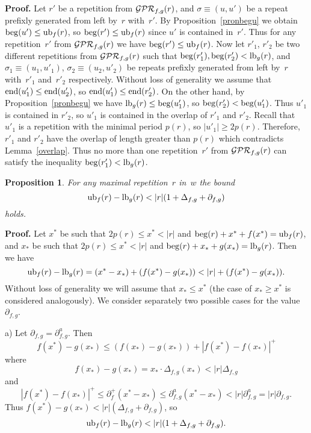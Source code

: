 \documentclass{article}
\newtheorem{proposition}{Proposition}
\begin{document}
{\bf Proof.} Let $r'$ be a repetition from ${\cal GPR}_{f,g} (r)$, and
$\sigma\equiv (u, u')$ be a repeat prefixly generated from left by~$r$ 
with~$r'$. By Proposition~\ref{pronbegu} we obtain ${\rm beg} (u')\le {\rm ub}_f (r)$,
so ${\rm beg} (r')\le {\rm ub}_f (r)$ since $u'$ is contained in~$r'$.
Thus for any repetition~$r'$ from ${\cal GPR}_{f,g} (r)$ we have
${\rm beg} (r')\le {\rm ub}_f (r)$. Now let $r'_1$, $r'_2$ be two different
repetitions from ${\cal GPR}_{f,g} (r)$ such that 
${\rm beg} (r'_1), {\rm beg} (r'_2)<{\rm lb}_g (r)$, and $\sigma_1\equiv (u_1, u'_1)$,
$\sigma_2\equiv (u_2, u'_2)$ be repeats prefixly generated from left by~$r$ 
with~$r'_1$ and~$r'_2$ respectively. Without loss of generality we assume
that ${\rm end} (u'_1)\le {\rm end} (u'_2)$, so ${\rm end} (u'_1)\le {\rm end} (r'_2)$.
On the other hand, by Proposition~\ref{pronbegu} we have ${\rm lb}_g (r)\le {\rm beg} (u'_1)$,
so ${\rm beg} (r'_2)<{\rm beg} (u'_1)$. Thus $u'_1$ is contained in $r'_2$, so
$u'_1$ is contained in the overlap of $r'_1$ and $r'_2$. Recall that $u'_1$ is
a repetition with the minimal period $p(r)$, so $|u'_1|\ge 2p(r)$. Therefore, $r'_1$ 
and $r'_2$ have the overlap of length greater than $p(r)$ which contradicts
Lemma~\ref{overlap}. Thus no more than one repetition~$r'$ from ${\cal GPR}_{f,g} (r)$
can satisfy the inequality ${\rm beg} (r'_1)<{\rm lb}_g (r)$.

\begin{proposition}
For any maximal repetition~$r$ in~$w$ the bound
$$
{\rm ub}_f (r)-{\rm lb}_g (r)<|r|(1+\Delta_{f, g}+\partial_{f, g})
$$
holds.
\label{ulbound}
\end{proposition}

{\bf Proof.} Let $x^*$ be such that $2p(r)\le x^*<|r|$ and ${\rm beg} (r)+x^*+f(x^*)={\rm ub}_f (r)$,
and $x_*$ be such that $2p(r)\le x^*<|r|$ and ${\rm beg} (r)+x_*+g(x_*)={\rm lb}_g (r)$. 
Then we have
$$
{\rm ub}_f (r)-{\rm lb}_g (r)=(x^*-x_*)+(f(x^*)-g(x_*))<|r|+(f(x^*)-g(x_*)).
$$
Without loss of generality we will assume that $x_*\le x^*$ (the case of $x_*\ge x^*$ 
is considered analogously). We consider separately two possible cases for
the value $\partial_{f, g}$.

a) Let $\partial_{f, g}=\partial^a_{f, g}$. Then
$$
f(x^*)-g(x_*)\le (f(x_*)-g(x_*))+|f(x^*)-f(x_*)|^+
$$
where
$$
f(x_*)-g(x_*)=x_*\cdot\Delta_{f, g}(x_*)<|r|\Delta_{f, g}
$$
and
$$
|f(x^*)-f(x_*)|^+\le \partial^+_f(x^*-x_*)\le \partial^a_{f, g}(x^*-x_*)
<|r|\partial^a_{f, g}=|r|\partial_{f, g}.
$$
Thus $f(x^*)-g(x_*)<|r|(\Delta_{f, g}+\partial_{f, g})$, so
$$
{\rm ub}_f (r)-{\rm lb}_g (r)<|r|(1+\Delta_{f, g}+\partial_{f, g}).
$$
\end{document}
